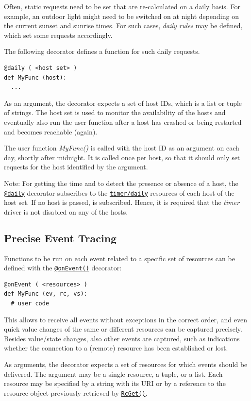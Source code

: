 \documentclass[12pt,english,parskip=half,headheight=19pt]{scrreprt}
\newcommand{\refrc}[1]{\hyperref[rc:#1]{\texttt{#1}}}
\newcommand{\refapipython}[1]{\href{home2l-api_python/index.html}{\mbox{\texttt{#1}}}}  %
\begin{document}
Often, static requests need to be set that are re-calculated on a daily basis. For example, an outdoor light might need to be switched on at night depending on the current sunset and sunrise times. For such cases, \textit{daily rules} may be defined, which set some requests accordingly.

The following decorator defines a function for such daily requests.
\begin{lstlisting}
@daily ( <host set> )
def MyFunc (host):
  ...
\end{lstlisting}

As an argument, the decorator expects a set of host IDs, which is a list or tuple of strings. The host set is used to monitor the availability of the hosts and eventually also run the user function after a host has crashed or being restarted and becomes reachable (again).

The user function \textit{MyFunc()} is called with the host ID as an argument on each day, shortly after midnight. It is called once per host, so that it should only set requests for the host identified by the argument.

Note: For getting the time and to detect the presence or absence of a host, the \refapipython{@daily} decorator subscribes to the \refrc{timer/daily} resources of each host of the host set. If no host is passed,  is subscribed. Hence, it is required that the \textit{timer} driver is not disabled on any of the hosts.



\subsection{Precise Event Tracing}
\label{sec:rules-actions-onevent}

Functions to be run on each event related to a specific set of resources can be defined with the \refapipython{@onEvent()} decorator:
\begin{lstlisting}
@onEvent ( <resources> )
def MyFunc (ev, rc, vs):
  # user code
\end{lstlisting}

This allows to receive all events without exceptions in the correct order, and even quick value changes of the same or different resources can be captured precisely. Besides value/state changes, also other events are captured, such as indications whether the connection to a (remote) resource has been established or lost.

As arguments, the decorator expects a set of resources for which events should be delivered. The argument may be a single resource, a tuple, or a list. Each resource may be specified by a string with its URI or by a reference to the resource object previously retrieved by \refapipython{RcGet()}.
\end{document}
